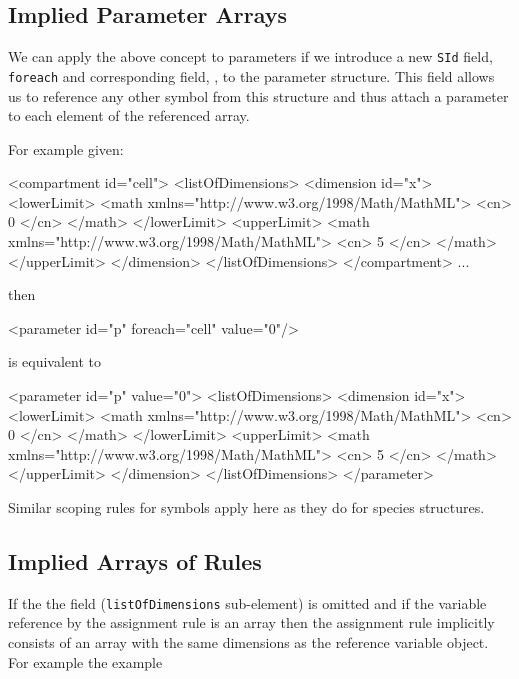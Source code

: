 \documentclass{cekarticle}
\begin{document}
\subsection{Implied Parameter Arrays}

We can apply the above concept to parameters if we introduce a
new \texttt{SId} field, \texttt{foreach} and corresponding  field, , to the parameter
structure. This field allows us to reference any other symbol
from this structure and thus attach a parameter to each element
of the referenced array.

For example given:
\begin{example}
<compartment id="cell">
    <listOfDimensions>
        <dimension id="x">
            <lowerLimit>
                <math xmlns="http://www.w3.org/1998/Math/MathML">
                    <cn> 0 </cn>
                </math>
            </lowerLimit>
            <upperLimit>
                <math xmlns="http://www.w3.org/1998/Math/MathML">
                    <cn> 5 </cn>
                </math>
            </upperLimit>
        </dimension>
    </listOfDimensions>
</compartment>
...
\end{example}
then
\begin{example}
<parameter id="p" foreach="cell" value="0"/>
\end{example}
is equivalent to
\begin{example}
<parameter id="p" value="0">
    <listOfDimensions>
        <dimension id="x">
            <lowerLimit>
                <math xmlns="http://www.w3.org/1998/Math/MathML">
                    <cn> 0 </cn>
                </math>
            </lowerLimit>
            <upperLimit>
                <math xmlns="http://www.w3.org/1998/Math/MathML">
                    <cn> 5 </cn>
                </math>
            </upperLimit>
        </dimension>
    </listOfDimensions>
</parameter>
\end{example}

Similar scoping rules for symbols apply here as they do for species structures.

\subsection{Implied Arrays of Rules}

If the the  field
(\texttt{listOfDimensions} sub-element) is omitted and if the variable reference by the
assignment rule is an array then the assignment rule implicitly consists of an array with the
same dimensions as the reference variable object.  For example the example
\end{document}
